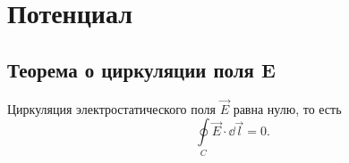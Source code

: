 \chapter{Потенциал}

\section{Теорема о циркуляции поля \textbf{E}}
    
    \begin{theorem}
        Циркуляция электростатического поля \( \vec{E} \) равна нулю, то есть
        \begin{equation}
            \oint\limits_C \vec{E}\cdot\dd\vec{l} = 0. \label{eq3:1}
        \end{equation}
    \end{theorem}
    
